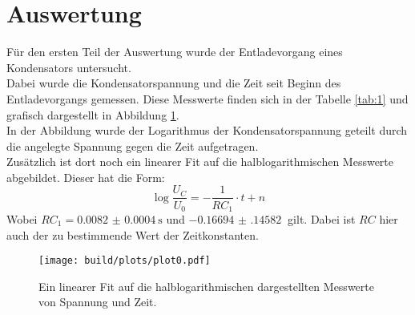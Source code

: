 \newpage
\section{Auswertung}
Für den ersten Teil der Auswertung wurde der Entladevorgang eines Kondensators untersucht.\\
Dabei wurde die Kondensatorspannung und die Zeit seit Beginn des Entladevorgangs gemessen.
Diese Messwerte finden sich in der Tabelle \ref{tab:1} und grafisch dargestellt in Abbildung \ref{img:1}.\\
In der Abbildung wurde der Logarithmus der Kondensatorspannung geteilt durch die angelegte Spannung gegen die Zeit aufgetragen.\\
Zusätzlich ist dort noch ein linearer Fit auf die halblogarithmischen Messwerte abgebildet. Dieser hat die Form:
\begin{equation*}
    \log{\frac{U_C}{U_0}}= -\frac{1}{RC_1}\cdot t +n
\end{equation*}
Wobei $RC_1= \SI{0.0082(4)}{\second}$ und $\SI{-0.16694(14582)}{}$ gilt. Dabei ist $RC$ hier auch der zu bestimmende Wert der Zeitkonstanten.

\begin{figure}[h]
    \centering
    \texttt{[image: build/plots/plot0.pdf]}
    \caption{Ein linearer Fit auf die halblogarithmischen dargestellten Messwerte von Spannung und Zeit.}
    \label{img:1}
\end{figure}

